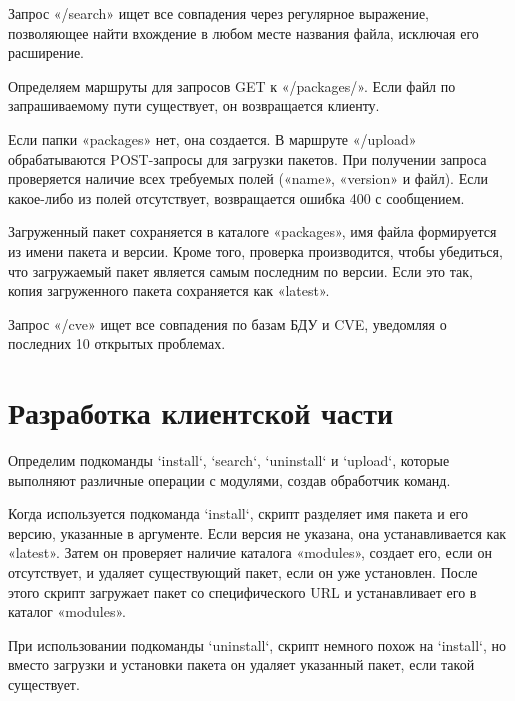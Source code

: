 \begin{listing}[H]
\end{listing}
Запрос «/search» ищет все совпадения через регулярное выражение, позволяющее найти вхождение в любом месте названия файла, исключая его расширение.

Определяем маршруты для запросов GET к «/packages/». Если файл по запрашиваемому пути существует, он возвращается клиенту. 

Если папки «packages» нет, она создается. В маршруте «/upload» обрабатываются POST-запросы для загрузки пакетов. При получении запроса проверяется наличие всех требуемых полей («name», «version» и файл). Если какое-либо из полей отсутствует, возвращается ошибка 400 с сообщением. 

\begin{listing}[H]
\end{listing}

Загруженный пакет сохраняется в каталоге «packages», имя файла формируется из имени пакета и версии. Кроме того, проверка производится, чтобы убедиться, что загружаемый пакет является самым последним по версии. Если это так, копия загруженного пакета сохраняется как «latest». 

\begin{listing}[H]
\end{listing}
\label{lst:c}

Запрос «/cve» ищет все совпадения по базам БДУ и CVE, уведомляя о последних 10 открытых проблемах.

\section{Разработка клиентской части}

Определим подкоманды `install`, `search`, `uninstall` и `upload`, которые выполняют различные операции с модулями, создав обработчик команд.

Когда используется подкоманда `install`, скрипт разделяет имя пакета и его версию, указанные в аргументе. Если версия не указана, она устанавливается как «latest». Затем он проверяет наличие каталога «modules», создает его, если он отсутствует, и удаляет существующий пакет, если он уже установлен. После этого скрипт загружает пакет со специфического URL и устанавливает его в каталог «modules».

При использовании подкоманды `uninstall`, скрипт немного похож на `install`, но вместо загрузки и установки пакета он удаляет указанный пакет, если такой существует.

